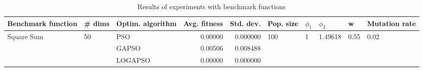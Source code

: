 \begin{table}
\centering
\caption{Results of experiments with benchmark functions}
\begin{tabular}{lllrrlllll}
\toprule
         Benchmark function &             \# dims & Optim. algorithm &  Avg. fitness &  Std. dev. &            Pop. size &         $\phi_{1}$ &               $\phi_{2}$ &                     w &         Mutation rate \\
\midrule
\multirow{3}{*}{Square Sum} & \multirow{3}{*}{50} &              PSO &       0.00000 &   0.000000 & \multirow{3}{*}{100} & \multirow{3}{*}{1} & \multirow{3}{*}{1.49618} & \multirow{3}{*}{0.55} & \multirow{3}{*}{0.02} \\
                            &                     &            GAPSO &       0.00506 &   0.008488 &                      &                    &                          &                       &                       \\
                            &                     &          LOGAPSO &       0.00000 &   0.000000 &                      &                    &                          &                       &                       \\
\bottomrule
\end{tabular}
\end{table}
